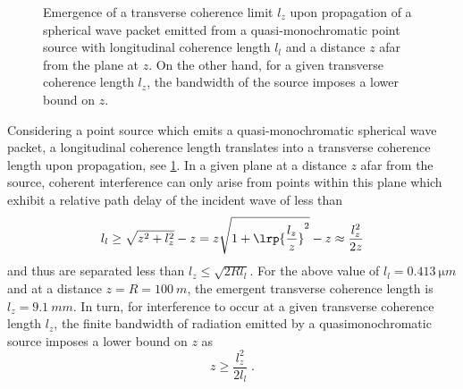 \documentclass[
twoside,
openright,
titlepage,
numbers=noenddot,
headinclude,
fleqn,
a4paper,
footinclude=true,
cleardoublepage=empty,
abstractoff,
BCOR=5mm,
paper=a4,
fontsize=11pt,
british,ngerman,american,
]{scrreprt}
\begin{document}
\begin{figure}
  \centering
  \small
  \caption[Emergence of a transverse coherence limit from a
  quasimonochromatic source.]{Emergence of a transverse coherence
    limit $l_z$ upon propagation of a spherical wave packet emitted
    from a quasi-monochromatic point source with longitudinal
    coherence length $l_l$ and a distance $z$ afar from the plane at
    $z$.  On the other hand, for a given transverse coherence length
    $l_z$, the bandwidth of the source imposes a lower bound on $z$.}
  \label{fig:longitudinal-coherence}
\end{figure}

Considering a point source which emits a quasi-monochromatic spherical
wave packet, a longitudinal coherence length translates into a
transverse coherence length upon propagation, see
\cref{fig:longitudinal-coherence}.  In a given plane at a distance $z$
afar from the source, coherent interference can only arise from points
within this plane which exhibit a relative path delay of the incident
wave of less than
\begin{equation}
  \label{eq:quasi-mono-coherence-limit}
  l_l \ge \sqrt{z^2+l_z^2} - z 
  = z \sqrt{ 1 + \lrp{ \frac{l_z}{z} }^2} - z
  \approx \frac{l_z^2}{2 z} 
\end{equation}
and thus are separated less than $l_z \le \sqrt{2 R l_l }$.  For the
above value of $l_l =\SI{0.413}{\micro m}$ and at a distance
$z=R=\SI{100}{m}$, the emergent transverse coherence length is $l_z =
\SI{9.1}{mm}$.  In turn, for interference to occur at a given
transverse coherence length $l_z$, the finite bandwidth of radiation
emitted by a quasimonochromatic source imposes a lower bound on $z$ as
\begin{equation}
  \label{eq:minimum-distance}
  z \ge  \frac{l_z^2}{2 l_l}\;.
\end{equation}
\end{document}
